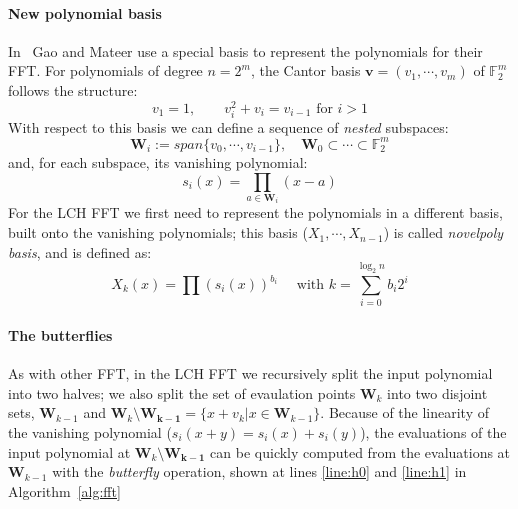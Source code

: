 \documentclass[11pt,a4paper,twocolumn]{article}
\theoremstyle{definition}
\begin{document}
\paragraph{New polynomial basis} In~\cite{DBLP:journals/tit/GaoM10} Gao and Mateer use a special basis to
represent the polynomials for their FFT. For polynomials of degree $n=2^m$, the Cantor basis $\mathbf{v} = (v_1, \cdots, v_m)$
of $\mathds{F}_2^m$ follows the structure:
\begin{equation*}
    v_1 = 1, \qquad v_i^2+v_i = v_{i-1} \text{  for } i > 1
\end{equation*}
With respect to this basis we can define a sequence of \emph{nested} subspaces:
\begin{equation*}
    \mathbf{W}_i := span\{v_0, \cdots, v_{i-1}\}, \quad \mathbf{W}_0 \subset \cdots \subset \mathds{F}_2^m
\end{equation*}
and, for each subspace, its vanishing polynomial:
\begin{equation*}
    s_i(x) = \prod_{a \in \mathbf{W}_i}(x-a)
\end{equation*}
For the LCH FFT we first need to represent the polynomials in a different basis, built onto the vanishing polynomials;
this basis ($X_1, \cdots, X_{n-1}$) is called \emph{novelpoly basis}, and is defined as:
\begin{equation*}
    X_k(x) = \prod(s_i(x))^{b_i} \quad \text{ with } k=\sum_{i=0}^{\log_2 n}b_i2^i
\end{equation*}

\paragraph{The butterflies}
As with other FFT, in the LCH FFT we recursively split the input polynomial into two halves; we also split the 
set of evaulation points $\mathbf{W}_k$ into two disjoint sets, $\mathbf{W}_{k-1}$ and $\mathbf{W}_k \setminus \mathbf{W_{k-1}} = \{x+v_k|x\in \mathbf{W}_{k-1}\}$.
Because of the linearity of the vanishing polynomial ($s_i(x+y) = s_i(x)+s_i(y)$), the evaluations of the input polynomial at
$\mathbf{W}_k \setminus \mathbf{W_{k-1}}$ can be quickly computed from the evaluations at $\mathbf{W}_{k-1}$ with the \textit{butterfly} operation,
shown at lines \ref{line:h0} and \ref{line:h1} in Algorithm~\ref{alg:fft}
\end{document}
